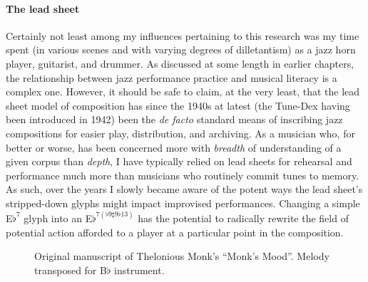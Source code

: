     \paragraph{The lead sheet}
    
    Certainly not least among my influences pertaining to this research was my time spent (in various scenes and with varying degrees of dilletantism) as a jazz horn player, guitarist, and drummer. As discussed at some length in earlier chapters, the relationship between jazz performance practice and musical literacy is a complex one. However, it should be safe to claim, at the very least, that the lead sheet model of composition has since the 1940s at latest (the Tune-Dex having been introduced in 1942) been the \textit{de facto} standard means of inscribing jazz compositions for easier play, distribution, and archiving. As a musician who, for better or worse, has been concerned more with \textit{breadth} of understanding of a given corpus than \textit{depth}, I have typically relied on lead sheets for rehearsal and performance much more than musicians who routinely commit tunes to memory. As such, over the years I slowly became aware of the potent ways the lead sheet's stripped-down glyphs might impact improvised performances. Changing a simple E$\flat^{7}$ glyph into an E$\flat^{7(\flat 9 \sharp 9 \flat 13)}$ has the potential to radically rewrite the field of potential action afforded to a player at a particular point in the composition.

    \begin{figure}
        \centering
        \captionsetup{width=.5\textwidth}
        \caption[Original manuscript of Thelonious Monk's ``Monk's Mood''. Melody transposed for B$\flat$ instrument.]{Original manuscript of Thelonious Monk's ``Monk's Mood''. Melody transposed for B$\flat$ instrument.\footnotemark}
        \label{fig:monk}
    \end{figure}

